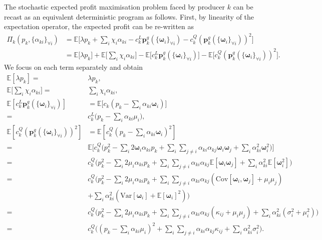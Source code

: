 \documentclass{article}
\begin{document}
The stochastic expected profit maximisation problem faced by producer $k$ can be recast as an equivalent deterministic program as follows. First, by linearity of the expectation operator, the expected profit can be re-written as
\begin{align*}
\Pi_k(p_k, \{\alpha_{ki}\}_{\forall i}) &= \mathbb{E}\Big[\lambda p_k + \sum_i \chi_i \alpha_{ki} - c_k^L \mathbf{p}_k^g(\{\boldsymbol{\omega}_i\}_{\forall i}) - c_k^Q (\mathbf{p}_k^g(\{\boldsymbol{\omega}_i\}_{\forall i}))^2\Big]\\
&= \mathbb{E}\big[\lambda p_k\big] + \mathbb{E}\Big[\sum_i \chi_i \alpha_{ki}\Big] - \mathbb{E}\big[c_k^L \mathbf{p}_k^g(\{\boldsymbol{\omega}_i\}_{\forall i})\big] - \mathbb{E}\big[c_k^Q (\mathbf{p}_k^g(\{\boldsymbol{\omega}_i\}_{\forall i}))^2\big].
\end{align*}
We focus on each term separately and obtain
\begin{align*}
\mathbb{E}[\lambda p_k] =& \lambda p_k,\\
\mathbb{E}\Big[\sum_i \chi_i \alpha_{ki}\Big] =& \sum_i \chi_i \alpha_{ki},\\
\mathbb{E}[c_k^L \mathbf{p}_k^g(\{\boldsymbol{\omega}_i\}_{\forall i})] &= \mathbb{E}\Big[c_k (p_k - \sum_i \alpha_{ki} \boldsymbol{\omega}_i)\Big]\\
=& c_k^L\Big(p_k - \sum_i \alpha_{ki} \mu_i\Big),\\
\mathbb{E}[c_k^Q (\mathbf{p}_k^g(\{\boldsymbol{\omega}_i\}_{\forall i}))^2] &= \mathbb{E}[c_k^Q (p_k - \sum_i \alpha_{ki} \boldsymbol{\omega}_i)^2]\\
=& \mathbb{E}\Big[c_k^Q \big(p_k^2 - \sum_i 2 \boldsymbol{\omega}_i \alpha_{ki} p_k + \sum_i \sum_{j \ne i} \alpha_{ki} \alpha_{kj}  \boldsymbol{\omega}_i  \boldsymbol{\omega}_j + \sum_i \alpha_{ki}^2 \boldsymbol{\omega}_i^2\big)\Big]\\
=& c_k^Q \Big(p_k^2 - \sum_i 2\mu_i \alpha_{ki} p_k + \sum_i \sum_{j \ne i} \alpha_{ki} \alpha_{kj}  \mathbb{E}[\boldsymbol{\omega}_i  \boldsymbol{\omega}_j] + \sum_i \alpha_{ki}^2 \mathbb{E}[\boldsymbol{\omega}_i^2]\Big)\\
=& c_k^Q \Big(p_k^2 - \sum_i 2\mu_i \alpha_{ki} p_k + \sum_i \sum_{j \ne i} \alpha_{ki} \alpha_{kj}  (\mbox{Cov}[\boldsymbol{\omega}_i, \boldsymbol{\omega}_j] + \mu_i \mu_j)\\
 &+ \sum_i \alpha_{ki}^2 (\mbox{Var}[\boldsymbol{\omega}_i] + \mathbb{E}[\boldsymbol{\omega}_i]^2)\Big)\\
=& c_k^Q \Big(p_k^2 - \sum_i 2\mu_i \alpha_{ki} p_k + \sum_i \sum_{j \ne i} \alpha_{ki} \alpha_{kj}  (\kappa_{ij} + \mu_i \mu_j) + \sum_i \alpha_{ki}^2 (\sigma_i^2 + \mu_i^2)\Big)\\
=& c_k^Q \Big((p_k - \sum_i \alpha_{ki} \mu_i)^2 + \sum_i \sum_{j \ne i} \alpha_{ki} \alpha_{kj}  \kappa_{ij} + \sum_i \alpha_{ki}^2 \sigma_i^2 \Big).
\end{align*}
\end{document}
